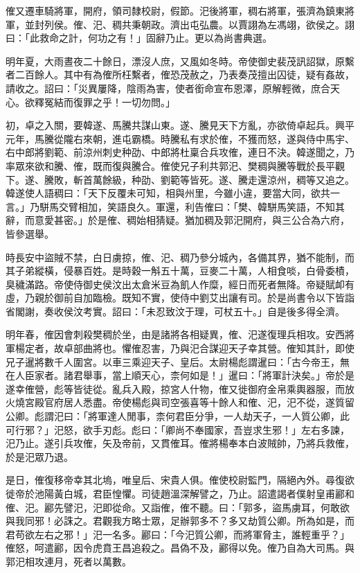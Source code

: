 \begin{pinyinscope}
傕又遷車騎將軍，開府，領司隸校尉，假節。汜後將軍，稠右將軍，張濟為鎮東將軍，並封列侯。傕、汜、稠共秉朝政。濟出屯弘農。以賈詡為左馮翊，欲侯之。詡曰：「此救命之計，何功之有！」固辭乃止。更以為尚書典選。

明年夏，大雨晝夜二十餘日，漂沒人庶，又風如冬時。帝使御史裴茂訊詔獄，原繫者二百餘人。其中有為傕所枉繫者，傕恐茂赦之，乃表奏茂擅出囚徒，疑有姦故，請收之。詔曰：「災異屢降，陰雨為害，使者銜命宣布恩澤，原解輕微，庶合天心。欲釋冤結而復罪之乎！一切勿問。」

初，卓之入關，要韓遂、馬騰共謀山東。遂、騰見天下方亂，亦欲倚卓起兵。興平元年，馬騰從隴右來朝，進屯霸橋。時騰私有求於傕，不獲而怒，遂與侍中馬宇、右中郎將劉範、前涼州刺史种劭、中郎將杜稟合兵攻傕，連日不決。韓遂聞之，乃率眾來欲和騰、傕，既而復與騰合。傕使兄子利共郭汜、樊稠與騰等戰於長平觀下。遂、騰敗，斬首萬餘級，种劭、劉範等皆死。遂、騰走還涼州，稠等又追之。韓遂使人語稠曰：「天下反覆未可知，相與州里，今雖小違，要當大同，欲共一言。」乃駢馬交臂相加，笑語良久。軍還，利告傕曰：「樊、韓駢馬笑語，不知其辭，而意愛甚密。」於是傕、稠始相猜疑。猶加稠及郭汜開府，與三公合為六府，皆參選舉。

時長安中盜賊不禁，白日虜掠，傕、汜、稠乃參分城內，各備其界，猶不能制，而其子弟縱橫，侵暴百姓。是時穀一斛五十萬，豆麥二十萬，人相食啖，白骨委樍，臭穢滿路。帝使侍御史侯汶出太倉米豆為飢人作糜，經日而死者無降。帝疑賦卹有虛，乃親於御前自加臨檢。既知不實，使侍中劉艾出讓有司。於是尚書令以下皆詣省閣謝，奏收侯汶考實。詔曰：「未忍致汶于理，可杖五十。」自是後多得全濟。

明年春，傕因會刺殺樊稠於坐，由是諸將各相疑異，傕、汜遂復理兵相攻。安西將軍楊定者，故卓部曲將也。懼傕忍害，乃與汜合謀迎天子幸其營。傕知其計，即使兄子暹將數千人圍宮。以車三乘迎天子、皇后。太尉楊彪謂暹曰：「古今帝王，無在人臣家者。諸君舉事，當上順天心，柰何如是！」暹曰：「將軍計決矣。」帝於是遂幸傕營，彪等皆徒從。亂兵入殿，掠宮人什物，傕又徙御府金帛乘輿器服，而放火燒宮殿官府居人悉盡。帝使楊彪與司空張喜等十餘人和傕、汜，汜不從，遂質留公卿。彪謂汜曰：「將軍達人閒事，柰何君臣分爭，一人劫天子，一人質公卿，此可行邪？」汜怒，欲手刃彪。彪曰：「卿尚不奉國家，吾豈求生邪！」左右多諫，汜乃止。遂引兵攻傕，矢及帝前，又貫傕耳。傕將楊奉本白波賊帥，乃將兵救傕，於是汜眾乃退。

是日，傕復移帝幸其北塢，唯皇后、宋貴人俱。傕使校尉監門，隔絕內外。尋復欲徙帝於池陽黃白城，君臣惶懼。司徒趙溫深解譬之，乃止。詔遣謁者僕射皇甫酈和傕、汜。酈先譬汜，汜即從命。又詣傕，傕不聽。曰：「郭多，盜馬虜耳，何敢欲與我同邪！必誅之。君觀我方略士眾，足辦郭多不？多又劫質公卿。所為如是，而君苟欲左右之邪！」汜一名多。酈曰：「今汜質公卿，而將軍脅主，誰輕重乎？」傕怒，呵遣酈，因令虎賁王昌追殺之。昌偽不及，酈得以免。傕乃自為大司馬。與郭汜相攻連月，死者以萬數。


\end{pinyinscope}
